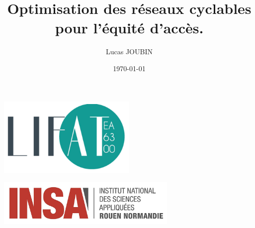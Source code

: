 \title{Optimisation des réseaux cyclables pour l’équité d’accès.}
\author{Lucas JOUBIN}
\date{\today}

\makeatletter
\let\thetitle\@title
\let\theauthor\@author
\let\thedate\@date
\makeatother

\begin{titlepage}
	\begin{minipage}{0.5\textwidth}
		\begin{flushleft} \includegraphics[width=0.5\textwidth]{images/LOGOLIFAT700x400.png}
			\end{flushleft}
			\end{minipage}
			\begin{minipage}{0.5\textwidth}
            
			\begin{flushright} \includegraphics[width=0.65\textwidth]{images/logo_insa.png}
		\end{flushright}
        
	\end{minipage}\\[.5 cm]
	    

\end{titlepage}
